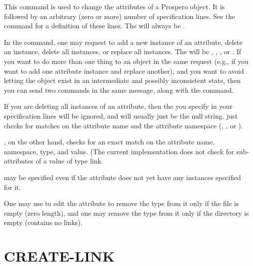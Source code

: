 \begin{command}
  \commandsize
   
  
\end{command}

This command is used to change the attributes of a Prospero object.
It is followed by an arbitrary (zero or more) number of
 specification lines.  See the
 command for a definition of these lines.    The
 will always be .

In the command, one may request to add a new instance of an attribute, delete
an instance, delete all instances, or replace all instances.  The
 will be , ,
, or .  If you want to do more than one
thing to an object in 
the same request (e.g., if you want to add one attribute instance and
replace another), and you want to avoid letting the object exist in an
intermediate and possibly inconsistent state, then you can send two
 commands in the same message, along with the
 command.

If you are deleting all instances of an attribute, then the
 you specify in your 
specification lines will be ignored, and will usually just be the null
string.   just checks for matches on the attribute
name and the attribute namespace (, , or
). 

, on the other hand, checks for an exact match on the
attribute name, namespace, type, and value.  (The current
implementation does not check for sub-attributes of a value of type
link.  

 may
be specified even if the attribute does not yet have any instances
specified for it.

One may use  to edit the 
attribute to remove the  type from it only if the file is
empty (zero length), and one may remove the  type from
it only if the directory is empty (contains no links).


\section{CREATE-LINK}

\begin{command}
  \commandsize
	  \ors {} \metaor {} \ore 
   
   
\zoos{}  \zooe
\end{command}

